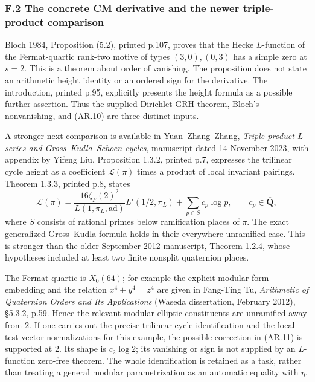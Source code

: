 \documentclass[11pt,a4paper]{article}
\begin{document}
\subsubsection{F.2 The concrete CM derivative and the newer
triple-product
comparison}\label{f.2-the-concrete-cm-derivative-and-the-newer-triple-product-comparison}

Bloch 1984, Proposition (5.2), printed p.107, proves that the Hecke
\(L\)-function of the Fermat-quartic rank-two motive of types
\((3,0),(0,3)\) has a simple zero at \(s=2\). This is a theorem about
order of vanishing. The proposition does not state an arithmetic height
identity or an ordered sign for the derivative. The introduction,
printed p.95, explicitly presents the height formula as a possible
further assertion. Thus the supplied Dirichlet-GRH theorem, Bloch's
nonvanishing, and (AR.10) are three distinct inputs.

A stronger next comparison is available in Yuan--Zhang--Zhang,
\emph{Triple product L-series and Gross--Kudla--Schoen cycles},
manuscript dated 14 November 2023, with appendix by Yifeng Liu.
Proposition 1.3.2, printed p.7, expresses the trilinear cycle height as
a coefficient \(\mathcal L(\pi)\) times a product of local invariant
pairings. Theorem 1.3.3, printed p.8, states \[
\mathcal L(\pi)=
\frac{16\zeta_F(2)^2}{L(1,\pi_L,\mathrm{ad})}
 L'(1/2,\pi_L)+\sum_{p\in S}c_p\log p,
\qquad c_p\in\overline{\mathbf Q},
\tag{AR.11}
\] where \(S\) consists of rational primes below ramification places of
\(\pi\). The exact generalized Gross--Kudla formula holds in their
everywhere-unramified case. This is stronger than the older September
2012 manuscript, Theorem 1.2.4, whose hypotheses included at least two
finite nonsplit quaternion places.

The Fermat quartic is \(X_0(64)\); for example the explicit modular-form
embedding and the relation \(x^4+y^4=z^4\) are given in Fang-Ting Tu,
\emph{Arithmetic of Quaternion Orders and Its Applications} (Waseda
dissertation, February 2012), §5.3.2, p.59. Hence the relevant modular
elliptic constituents are unramified away from \(2\). If one carries out
the precise trilinear-cycle identification and the local test-vector
normalizations for this example, the possible correction in (AR.11) is
supported at \(2\). Its shape is \(c_2\log2\); its vanishing or sign is
not supplied by an \(L\)-function zero-free theorem. The whole
identification is retained as a task, rather than treating a general
modular parametrization as an automatic equality with \(\eta\).
\end{document}
